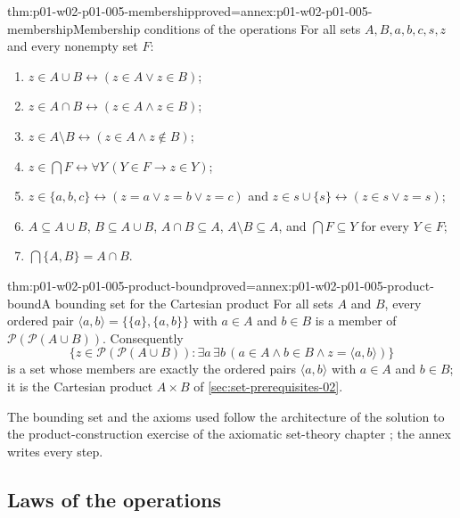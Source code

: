 \begin{hblemma}{thm:p01-w02-p01-005-membership}{proved=annex:p01-w02-p01-005-membership}{Membership conditions of the operations}
For all sets \(A,B,a,b,c,s,z\) and every nonempty set \(F\):
\begin{enumerate}
  \item \(z\in A\cup B\leftrightarrow(z\in A\lor z\in B)\);
  \item \(z\in A\cap B\leftrightarrow(z\in A\land z\in B)\);
  \item \(z\in A\setminus B\leftrightarrow(z\in A\land z\notin B)\);
  \item \(z\in\bigcap F\leftrightarrow\forall Y\,(Y\in F\to z\in Y)\);
  \item \(z\in\{a,b,c\}\leftrightarrow(z=a\lor z=b\lor z=c)\) and
        \(z\in s\cup\{s\}\leftrightarrow(z\in s\lor z=s)\);
  \item \(A\subseteq A\cup B\), \(B\subseteq A\cup B\),
        \(A\cap B\subseteq A\), \(A\setminus B\subseteq A\), and
        \(\bigcap F\subseteq Y\) for every \(Y\in F\);
  \item \(\bigcap\{A,B\}=A\cap B\).
\end{enumerate}
\end{hblemma}

\begin{hblemma}{thm:p01-w02-p01-005-product-bound}{proved=annex:p01-w02-p01-005-product-bound}{A bounding set for the Cartesian product}
For all sets \(A\) and \(B\), every ordered pair
\(\langle a,b\rangle=\{\{a\},\{a,b\}\}\) with \(a\in A\) and \(b\in B\) is a
member of \(\mathcal P(\mathcal P(A\cup B))\). Consequently
\[
  \{z\in\mathcal P(\mathcal P(A\cup B)):
    \exists a\,\exists b\,(a\in A\land b\in B\land z=\langle a,b\rangle)\}
\]
is a set whose members are exactly the ordered pairs \(\langle a,b\rangle\)
with \(a\in A\) and \(b\in B\); it is the Cartesian product \(A\times B\) of
\cref{sec:set-prerequisites-02}.
\end{hblemma}

The bounding set and the axioms used follow the architecture of the solution to
the product-construction exercise of the axiomatic set-theory chapter
\cite[ch.~``Exercise Feedback'', sec.~``Set theory and forcing'', solution to
the first exercise of ``The Axioms of ZF and ZFC'']{FrozenFormalLogicSetOperations};
the annex writes every step.

\subsection{Laws of the operations}
\label{sec:p01-w02-p01-005-laws}

